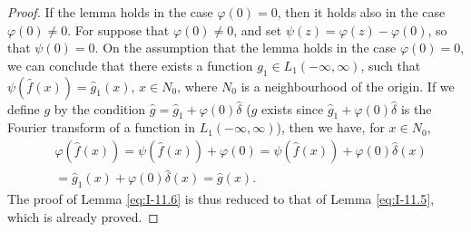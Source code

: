 \begin{proof}
If the lemma holds in the case $\varphi(0)=0$, then it holds also in the case $\varphi(0)\neq 0$. For suppose that $\varphi(0)\neq 0$, and set $\psi(z)=\varphi(z)-\varphi(0)$, so that $\psi(0)=0$. On the assumption that the lemma holds in the case $\varphi(0)=0$, we can conclude that there exists a function $g_1\in L_1(-\infty,\infty)$, such that $\psi(\widehat f(x))=\widehat g_1(x)$, $x\in N_0$, where $N_0$ is a neighbourhood of the origin. If we define $g$ by the condition $\widehat g=\widehat g_1+\varphi(0)\widehat\delta$ ($g$ exists since $\widehat g_1+\varphi(0)\widehat\delta$ is the Fourier transform of a function in $L_1(-\infty,\infty)$), then we have, for $x\in N_0$,
\begin{equation*}
\begin{aligned}
&\varphi(\widehat f(x)) = \psi(\widehat f(x)) + \varphi(0) = \psi(\widehat f(x)) + \varphi(0)\widehat\delta(x)\\
&= \widehat g_1(x) + \varphi(0)\widehat\delta(x) = \widehat g(x).
\end{aligned}
\end{equation*}
The proof of Lemma \eqref{eq:I-11.6} is thus reduced to that of Lemma \eqref{eq:I-11.5}, which is already proved.
\end{proof}

